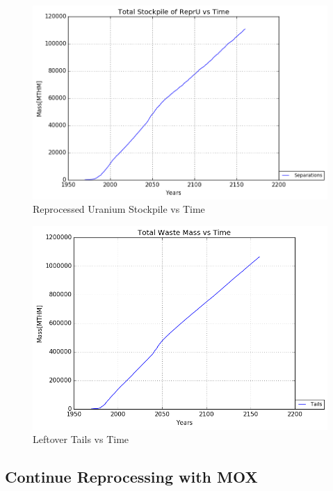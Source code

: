 \begin{figure}
	\includegraphics[width=\linewidth]{./images/stoprep_2020/Separations_Total_Stockpile.png}
	\caption{Reprocessed Uranium Stockpile vs Time}
	\label{fig:reprocess_fuel}
\end{figure}

\begin{figure}
	\includegraphics[width=\linewidth]{./images/stoprep_2020/Tails_total_Waste.png}
	\caption{Leftover Tails vs Time}
	\label{fig:reprocess_tails}
\end{figure}


\subsection{Continue Reprocessing with \gls{MOX}}

